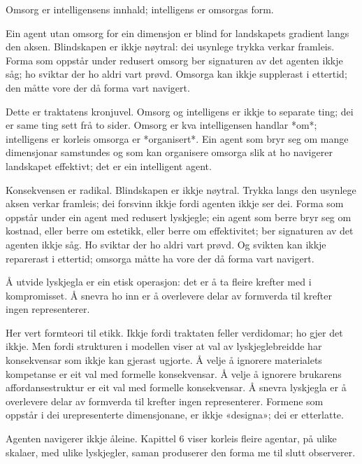 Omsorg er intelligensens innhald; intelligens er omsorgas form.

Ein agent utan omsorg for ein dimensjon er blind for landskapets gradient langs den aksen. Blindskapen er ikkje nøytral: dei usynlege trykka verkar framleis. Forma som oppstår under redusert omsorg ber signaturen av det agenten ikkje såg; ho sviktar der ho aldri vart prøvd. Omsorga kan ikkje supplerast i ettertid; den måtte vore der då forma vart navigert.

Dette er traktatens kronjuvel. Omsorg og intelligens er ikkje to separate ting; dei er same ting sett frå to sider. Omsorg er kva intelligensen handlar *om*; intelligens er korleis omsorga er *organisert*. Ein agent som bryr seg om mange dimensjonar samstundes og som kan organisere omsorga slik at ho navigerer landskapet effektivt; det er ein intelligent agent.

Konsekvensen er radikal. Blindskapen er ikkje nøytral. Trykka langs den usynlege aksen verkar framleis; dei forsvinn ikkje fordi agenten ikkje ser dei. Forma som oppstår under ein agent med redusert lyskjegle; ein agent som berre bryr seg om kostnad, eller berre om estetikk, eller berre om effektivitet; ber signaturen av det agenten ikkje såg. Ho sviktar der ho aldri vart prøvd. Og svikten kan ikkje reparerast i ettertid; omsorga måtte ha vore der då forma vart navigert.

Å utvide lyskjegla er ein etisk operasjon: det er å ta fleire krefter med i kompromisset. Å snevra ho inn er å overlevere delar av formverda til krefter ingen representerer.

Her vert formteori til etikk. Ikkje fordi traktaten feller verdidomar; ho gjer det ikkje. Men fordi strukturen i modellen viser at val av lyskjeglebreidde har konsekvensar som ikkje kan gjerast ugjorte. Å velje å ignorere materialets kompetanse er eit val med formelle konsekvensar. Å velje å ignorere brukarens affordansestruktur er eit val med formelle konsekvensar. Å snevra lyskjegla er å overlevere delar av formverda til krefter ingen representerer. Formene som oppstår i dei urepresenterte dimensjonane, er ikkje «designa»; dei er etterlatte.

\begin{overgang}
Agenten navigerer ikkje åleine. Kapittel 6 viser korleis fleire agentar, på ulike skalaer, med ulike lyskjegler, saman produserer den forma me til slutt observerer.
\end{overgang}
